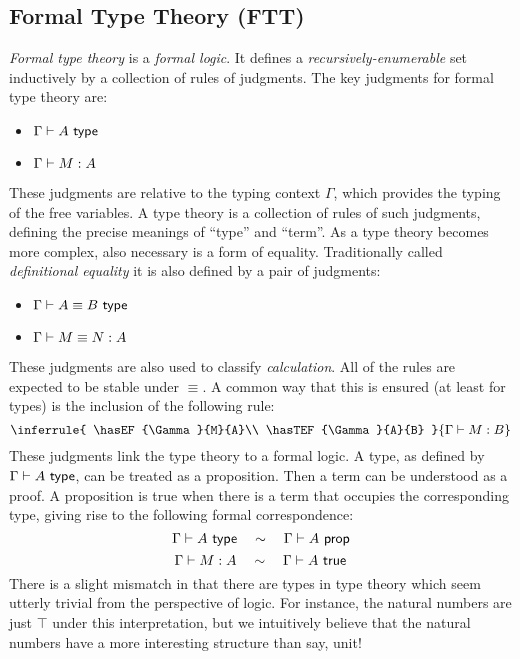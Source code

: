 \documentclass{article}
\begin{document}
\subsection{Formal Type Theory (FTT)}
\emph{Formal type theory} is a \emph{formal logic}. It defines a
\emph{recursively-enumerable} set inductively by a collection of rules of
judgments. The key judgments for formal type theory are:
\begin{itemize}
\item $\Gamma \vdash A\ \mathsf{type}$
\item $\Gamma \vdash M : A$
\end{itemize}
These judgments are relative to the typing context $\Gamma$, which provides the typing of the
free variables.  A type theory is a collection of rules of such judgments, defining the
precise meanings of ``type'' and ``term''. As a type theory becomes more complex, also
necessary is a form of equality. Traditionally called \emph{definitional equality} it is also
defined by a pair of judgments:
\begin{itemize}
\item $\Gamma \vdash A \equiv B\ \mathsf{type}$
\item $\Gamma \vdash M \equiv N : A$
\end{itemize}
These judgments are also used to classify \emph{calculation}. All of
the rules are expected to be stable under $\equiv$. A common way that
this is ensured (at least for types) is the inclusion of the following
rule:
\[
  \inferrule{
    \hasEF{\Gamma}{M}{A}\\
    \hasTEF{\Gamma}{A}{B}
  }{\hasEF{\Gamma}{M}{B}}
\]
These judgments link the type theory to a formal logic. A type, as
defined by $\Gamma \vdash A\ \mathsf{type}$, can be treated as a proposition. Then
a term can be understood as a proof. A proposition is true when there
is a term that occupies the corresponding type, giving rise to the following formal correspondence:
\[
\Gamma \vdash A\ \mathsf{type} \quad \sim \quad \Gamma \vdash A\ \mathsf{prop}\]
\[\Gamma \vdash M : A \quad \sim \quad \Gamma \vdash A\ \mathsf{true}
\]
There is a slight
mismatch in that there are types in type theory which seem utterly
trivial from the perspective of logic. For instance, the natural
numbers are just $\top$ under this interpretation, but we intuitively
believe that the natural numbers have a more interesting structure
than say, unit!
\end{document}

